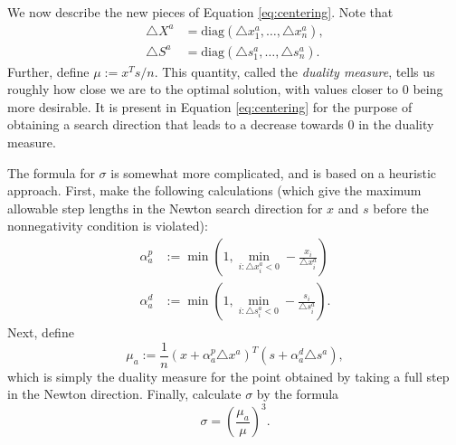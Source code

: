 We now describe the new pieces of Equation \ref{eq:centering}.
Note that
\begin{align*}
\triangle X^a &= \text{diag}(\triangle x_1^a,\ldots,\triangle x_n^a),\\
\triangle S^a &= \text{diag}(\triangle s_1^a,\ldots,\triangle s_n^a).
\end{align*}
Further, define $\mu := x^Ts/n$.
This quantity, called the \emph{duality measure}, tells us roughly how close we are to the optimal solution, with values closer to 0 being more desirable.
It is present in Equation \ref{eq:centering} for the purpose of obtaining a search direction that leads to a decrease towards 0 in the duality measure.

The formula for $\sigma$ is somewhat more complicated, and is based on a heuristic approach.
First, make the following calculations (which give the maximum allowable step lengths in the Newton search direction for $x$ and $s$ before the nonnegativity condition is violated):
\begin{align*}
\alpha_a^p &:= \min\left(1, \displaystyle\min_{i : \triangle x_i^a < 0}-\frac{x_i}{\triangle x_i^a}\right)\\
\alpha_a^d &:= \min\left(1, \displaystyle\min_{i : \triangle s_i^a < 0}-\frac{s_i}{\triangle s_i^a}\right).
\end{align*}
Next, define
\[
\mu_a := \frac{1}{n}(x+\alpha_a^p\triangle x^a)^T(s+\alpha_a^d\triangle s^a),
\]
which is simply the duality measure for the point obtained by taking a full step in the Newton direction.
Finally, calculate $\sigma$ by the formula
\[
\sigma = \left(\frac{\mu_a}{\mu}\right)^3.
\]

